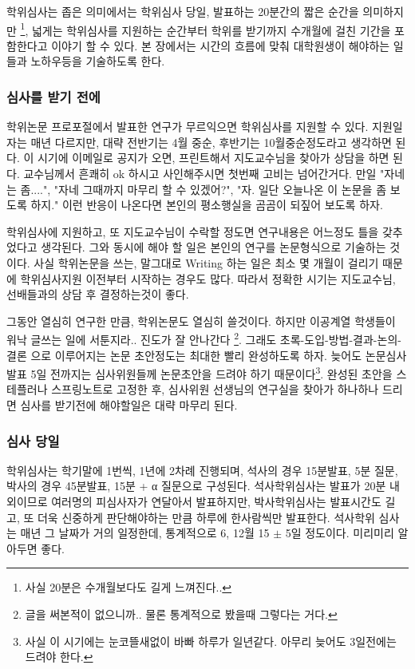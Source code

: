 학위심사는 좁은 의미에서는 학위심사 당일, 발표하는 20분간의 짧은 순간을
의미하지만 \footnote{사실 20분은 수개월보다도 길게 느껴진다..}, 넓게는 학위심사를
지원하는 순간부터 학위를 받기까지 수개월에 걸친 기간을 포함한다고 이야기 할 수
있다. 본 장에서는 시간의 흐름에 맞춰 대학원생이 해야하는 일들과 노하우등을
기술하도록 한다.
 
\subsubsection{심사를 받기 전에}
학위논문 프로포절에서 발표한 연구가 무르익으면 학위심사를 지원할 수
있다. 지원일자는 매년 다르지만, 대략 전반기는 4월 중순, 후반기는 10월중순정도라고
생각하면 된다. 이 시기에 이메일로 공지가 오면, 프린트해서 지도교수님을 찾아가
상담을 하면 된다. 교수님께서 흔쾌히 ok 하시고 사인해주시면 첫번째 고비는
넘어간거다. 만일 "자네는 좀....", "자네 그때까지 마무리 할 수 있겠어?", "자. 일단
오늘나온 이 논문을 좀 보도록 하지." 이런 반응이 나온다면 본인의 평소행실을 곰곰이
되짚어 보도록 하자.

학위심사에 지원하고, 또 지도교수님이 수락할 정도면 연구내용은 어느정도 틀을
갖추었다고 생각된다. 그와 동시에 해야 할 일은 본인의 연구를 논문형식으로 기술하는
것이다. 사실 학위논문을 쓰는, 말그대로 Writing 하는 일은 최소 몇 개월이 걸리기
때문에 학위심사지원 이전부터 시작하는 경우도 많다. 따라서 정확한 시기는
지도교수님, 선배들과의 상담 후 결정하는것이 좋다.

그동안 열심히 연구한 만큼, 학위논문도 열심히 쓸것이다. 하지만 이공계열 학생들이
워낙 글쓰는 일에 서툰지라.. 진도가 잘 안나간다 \footnote{글을 써본적이
  없으니까.. 물론 통계적으로 봤을때 그렇다는 거다.}. 그래도
초록-도입-방법-결과-논의-결론 으로 이루어지는 논문 초안정도는 최대한 빨리
완성하도록 하자. 늦어도 논문심사 발표 5일 전까지는 심사위원들께 논문초안을 드려야
하기 때문이다\footnote{사실 이 시기에는 눈코뜰새없이 바빠 하루가 일년같다. 아무리
  늦어도 3일전에는 드려야 한다.}. 완성된 초안을 스테플러나 스프링노트로 고정한
후, 심사위원 선생님의 연구실을 찾아가 하나하나 드리면 심사를 받기전에 해야할일은
대략 마무리 된다.

\subsubsection{심사 당일}
학위심사는 학기말에 1번씩, 1년에 2차례 진행되며, 석사의 경우 15분발표, 5분 질문,
박사의 경우 45분발표, 15분 + α 질문으로 구성된다. 석사학위심사는 발표가 20분
내외이므로 여러명의 피심사자가 연달아서 발표하지만, 박사학위심사는 발표시간도
길고, 또 더욱 신중하게 판단해야하는 만큼 하루에 한사람씩만 발표한다. 석사학위
심사는 매년 그 날짜가 거의 일정한데, 통계적으로 6, 12월 15 $\pm$ 5일
정도이다. 미리미리 알아두면 좋다.

